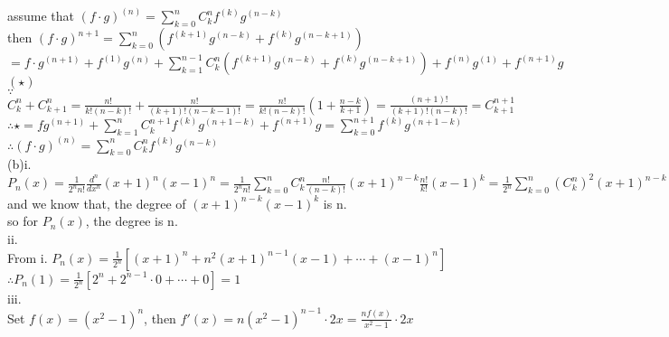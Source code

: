 \documentclass{article}
\begin{document}
assume that $(f\cdot g)^{(n)}=\sum \limits^n_{k=0}C^n_kf^{(k)}g^{(n-k)}$\\

then $(f\cdot g)^{n+1}=\sum \limits^n_{k=0}(f^{(k+1)}g^{(n-k)}+f^{(k)}g^{(n-k+1)})$\\

\qquad\qquad\qquad\quad$=f\cdot g^{(n+1)}+f^{(1)}g^{(n)}+\sum \limits^{n-1}_{k=1}C^n_k\left(f^{(k+1)}g^{(n-k)}+f^{(k)}g^{(n-k+1)}\right)+f^{(n)}g^{(1)}+f^{(n+1)}g$\qquad\qquad\qquad$(\star)$\\

$\because$\qquad $C^n_k+C^n_{k+1}=\displaystyle\frac{n!}{k!(n-k)!}+\frac{n!}{(k+1)!(n-k-1)!}=\frac{n!}{k!(n-k)!}\left(1+\frac{n-k}{k+1}\right)=\frac{(n+1)!}{(k+1)!(n-k)!}=C^{n+1}_{k+1}$\\

$\therefore$\qquad$\star=fg^{(n+1)}+\sum \limits^{n}_{k=1}C^{n+1}_kf^{(k)}g^{(n+1-k)}+f^{(n+1)}g=\sum \limits^{n+1}_{k=0}f^{(k)}g^{(n+1-k)}$\\

$\therefore$\qquad$(f\cdot g)^{(n)}=\sum \limits^n_{k=0}C^n_kf^{(k)}g^{(n-k)}$\\

(b)i.\\

$P_n(x)=\displaystyle\frac{1}{2^nn!}\frac{d^n}{dx^n}(x+1)^n(x-1)^n=\frac{1}{2^nn!}\sum \limits^n_{k=0}C^n_k\frac{n!}{(n-k)!}(x+1)^{n-k}\frac{n!}{k!}(x-1)^k=\frac{1}{2^n}\sum \limits^n_{k=0}(C^n_k)^2(x+1)^{n-k}(x-1)^k$\\

and we know that, the degree of $(x+1)^{n-k}(x-1)^k$ is n.\\

so for $P_n(x)$, the degree is n.\\

ii.\\

From i. $P_n(x)=\displaystyle\frac{1}{2^n}\left[(x+1)^n+n^2(x+1)^{n-1}(x-1)+\cdots+(x-1)^n\right]$\\

$\therefore$\qquad$P_n(1)=\displaystyle\frac{1}{2^n}[2^n+2^{n-1}\cdot0+\cdots+0]=1$\\

iii.\\

Set $f(x)=(x^2-1)^n$, then $f'(x)=n(x^2-1)^{n-1}\cdot2x=\displaystyle\frac{nf(x)}{x^2-1}\cdot2x$\\
\end{document}
